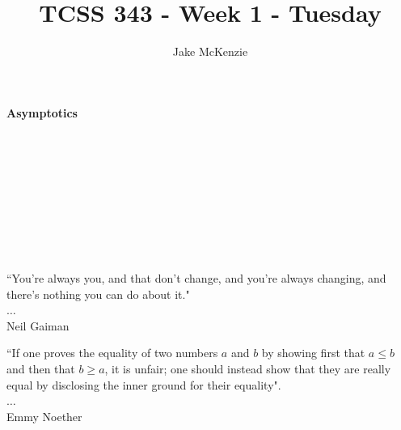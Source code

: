 \documentclass[12pt]{article}
\begin{document}
\title{TCSS 343 - Week 1 - Tuesday}
\author{Jake McKenzie}
\maketitle
\noindent\centerline{\textbf{Asymptotics}}\\\\\\\\\\\\\\\\
\begin{center}
    ``You're always you, and that don't change, and you're always changing, and there's nothing you can do about it." \\$\dots$\\ Neil Gaiman
\end{center}
\begin{center}
    ``If one proves the equality of two numbers $a$ and $b$ by showing first that $a \leq b$ and then that $b \geq a$, it is unfair; one should instead show that they are really equal by disclosing the inner ground for their equality". \\$\dots$\\Emmy Noether
\end{center}
\newpage
\end{document}
